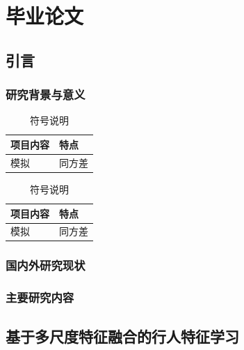 

%
\part{毕业论文}

\chapter{引言}

\section{研究背景与意义}

\cite{small}

{\wuhao
\begin{longtable}{p{5cm}p{5cm}}
\caption{符号说明}\\
\hline
项目内容 & 特点\\
\hline
模拟& 同方差\\
\hline
\end{longtable}
}

\begin{longtable}{p{5cm}p{5cm}}
\caption{符号说明}\\
\hline
项目内容 & 特点\\
\hline
模拟& 同方差\\
\hline
\end{longtable}


\section{国内外研究现状}
\section{主要研究内容}


\chapter{基于多尺度特征融合的行人特征学习}

